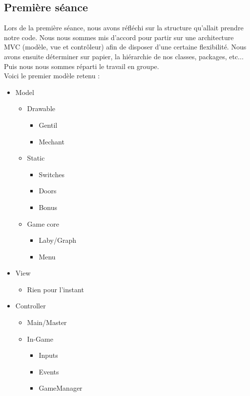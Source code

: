 \documentclass[a4paper]{article}
\begin{document}
\subsection{Première séance}
Lors de la première séance, nous avons réfléchi sur la structure qu'allait
prendre notre code. Nous nous sommes mis d'accord pour partir sur une
architecture MVC (modèle, vue et contrôleur) afin de disposer d'une certaine
flexibilité. Nous avons ensuite déterminer sur papier, la hiérarchie de nos
classes, packages, etc... Puis nous nous sommes réparti le travail en groupe. \\
Voici le premier modèle retenu :
\begin{itemize}

	\item Model \begin{itemize}
		\item Drawable \begin{itemize}
			\item Gentil
			\item Mechant
		\end{itemize}
		\item Static \begin{itemize}
			\item Switches
			\item Doors
			\item Bonus
		\end{itemize}
		\item Game core \begin{itemize}
			\item Laby/Graph
			\item Menu
		\end{itemize}
	\end{itemize}

	\item View \begin{itemize}
		\item Rien pour l'instant
	\end{itemize}

	\item Controller \begin{itemize}
		\item Main/Master
		\item In-Game \begin{itemize}
			\item Inputs
			\item Events
			\item GameManager
		\end{itemize}
	\end{itemize}

\end{itemize}
\end{document}
